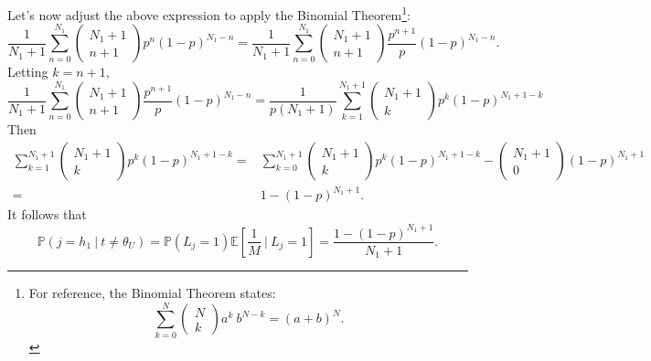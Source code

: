 Let's now adjust the above expression to apply the Binomial Theorem\footnote{For reference, the Binomial Theorem states: \begin{equation*}
    \sum_{k=0}^{N} \begin{pmatrix}
    N \\ k
\end{pmatrix} a^k \ b^{N-k} = (a+b)^N.
\end{equation*}}:
\begin{equation*}
    \frac{1}{N_1+1} \sum_{n=0}^{N_1} \begin{pmatrix}
        N_1+1 \\
        n+1
    \end{pmatrix} p^n (1-p)^{N_1-n} = \frac{1}{N_1+1} \sum_{n=0}^{N_1} \begin{pmatrix}
        N_1+1 \\
        n+1
    \end{pmatrix} \frac{p^{n+1}}{p} (1-p)^{N_1-n}.
\end{equation*}
Letting $k = n+1$,
\begin{equation*}
    \frac{1}{N_1+1} \sum_{n=0}^{N_1} \begin{pmatrix}
        N_1+1 \\
        n+1
    \end{pmatrix} \frac{p^{n+1}}{p} (1-p)^{N_1-n} = \frac{1}{p(N_1+1)} \sum_{k=1}^{N_1+1} \begin{pmatrix}
        N_1+1 \\
        k
    \end{pmatrix} p^k (1-p)^{N_1+1-k}
\end{equation*}
Then
\begin{align*}
    \sum_{k=1}^{N_1+1} \begin{pmatrix}
        N_1+1 \\
        k
    \end{pmatrix} p^k (1-p)^{N_1+1-k} = & \sum_{k=0}^{N_1+1} \begin{pmatrix}
        N_1+1 \\
        k
    \end{pmatrix} p^k (1-p)^{N_1+1-k} - \begin{pmatrix}
        N_1+1 \\
        0
    \end{pmatrix} (1-p)^{N_1+1} \\[5pt]
    = & 1 - (1-p)^{N_1+1}.
\end{align*}
It follows that
\begin{equation*}
    \mathbb{P}(j = h_1 \ | \ t \neq \theta_U) = \mathbb{P}(L_j=1) \mathbb{E}\left[\frac{1}{M} \ \bigg| \ L_j=1\right] = \frac{1 - (1-p)^{N_1+1}}{N_1+1}.
\end{equation*}

